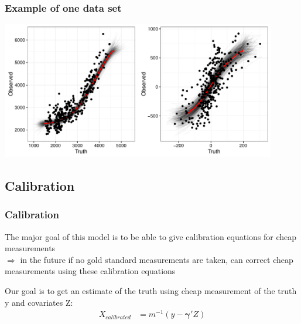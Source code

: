 \documentclass[handout]{beamer}\usepackage[]{graphicx}\usepackage[]{color}
\begin{document}


\begin{frame}
\frametitle{Example of one data set}
  \includegraphics[width=12cm,height=6cm]{predbvnsx.pdf}

\end{frame}

% 
% 

\subsection{Calibration}


\begin{frame}
\frametitle{Calibration}
The major goal of this model is to be able to give calibration equations for cheap measurements \\

$\Rightarrow$ in the future if no gold standard measurements are taken, can correct cheap measurements using these calibration equations \\

\vspace{0.2cm}

Our goal is to get an estimate of the truth using cheap measurement of the truth y and covariates Z:
\begin{align*}
  X_{calibrated} &= m^{-1}(y-\boldsymbol{\gamma}' Z) 
\end{align*}

\end{frame}


% 
% 
% 
% 
% 
% 
\end{document}
